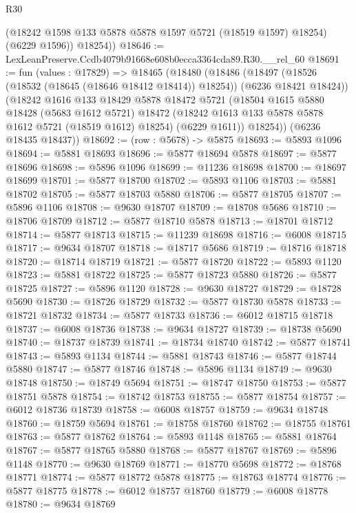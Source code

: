 \begin{lexlean}{R30}
\begin{coremodule}
          (@18242 @1598 @133 @5878 @5878 @1597 @5721 (@18519 @1597) @18254)
          (@6229 @1596))
        @18254))
@18646 := LexLeanPreserve.Ccdb4079b91668e608b0ecca3364cda89.R30.__rel_60
@18691 := fun (values : @17829) =>
  @18465
    (@18480
      (@18486
        (@18497 (@18526 (@18532 (@18645 (@18646 @18412 @18414)) @18254)) (@6236 @18421 @18424))
        (@18242
          @1616
          @133
          @18429
          @5878
          @18472
          @5721
          (@18504
            @1615
            @5880
            @18428
            (@5683 @1612 @5721)
            @18472
            (@18242 @1613 @133 @5878 @5878 @1612 @5721 (@18519 @1612) @18254)
            (@6229 @1611))
          @18254))
      (@6236 @18435 @18437))
@18692 := (row : @5678) -> @5875
@18693 := @5893 @1096
@18694 := @5881 @18693
@18696 := @5877 @18694 @5878
@18697 := @5877 @18696
@18698 := @5896 @1096
@18699 := @11236 @18698
@18700 := @18697 @18699
@18701 := @5877 @18700
@18702 := @5893 @1106
@18703 := @5881 @18702
@18705 := @5877 @18703 @5880
@18706 := @5877 @18705
@18707 := @5896 @1106
@18708 := @9630 @18707
@18709 := @18708 @5686
@18710 := @18706 @18709
@18712 := @5877 @18710 @5878
@18713 := @18701 @18712
@18714 := @5877 @18713
@18715 := @11239 @18698
@18716 := @6008 @18715
@18717 := @9634 @18707
@18718 := @18717 @5686
@18719 := @18716 @18718
@18720 := @18714 @18719
@18721 := @5877 @18720
@18722 := @5893 @1120
@18723 := @5881 @18722
@18725 := @5877 @18723 @5880
@18726 := @5877 @18725
@18727 := @5896 @1120
@18728 := @9630 @18727
@18729 := @18728 @5690
@18730 := @18726 @18729
@18732 := @5877 @18730 @5878
@18733 := @18721 @18732
@18734 := @5877 @18733
@18736 := @6012 @18715 @18718
@18737 := @6008 @18736
@18738 := @9634 @18727
@18739 := @18738 @5690
@18740 := @18737 @18739
@18741 := @18734 @18740
@18742 := @5877 @18741
@18743 := @5893 @1134
@18744 := @5881 @18743
@18746 := @5877 @18744 @5880
@18747 := @5877 @18746
@18748 := @5896 @1134
@18749 := @9630 @18748
@18750 := @18749 @5694
@18751 := @18747 @18750
@18753 := @5877 @18751 @5878
@18754 := @18742 @18753
@18755 := @5877 @18754
@18757 := @6012 @18736 @18739
@18758 := @6008 @18757
@18759 := @9634 @18748
@18760 := @18759 @5694
@18761 := @18758 @18760
@18762 := @18755 @18761
@18763 := @5877 @18762
@18764 := @5893 @1148
@18765 := @5881 @18764
@18767 := @5877 @18765 @5880
@18768 := @5877 @18767
@18769 := @5896 @1148
@18770 := @9630 @18769
@18771 := @18770 @5698
@18772 := @18768 @18771
@18774 := @5877 @18772 @5878
@18775 := @18763 @18774
@18776 := @5877 @18775
@18778 := @6012 @18757 @18760
@18779 := @6008 @18778
@18780 := @9634 @18769

\end{coremodule}
\end{lexlean}
